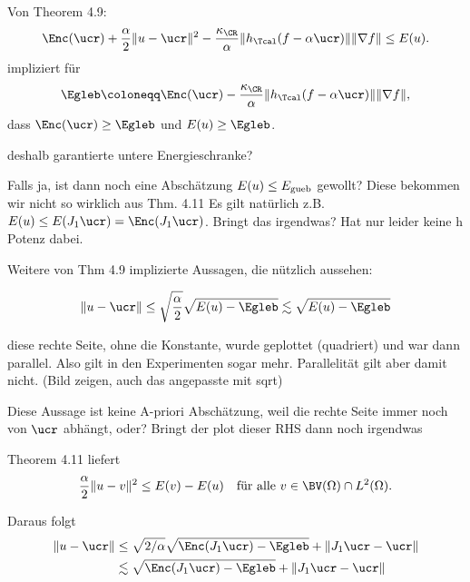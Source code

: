 Von Theorem 4.9:
  \begin{align*}
    \Enc(\ucr)+\frac{\alpha}{2}\Vert u-\ucr\Vert^2
    -\frac{\kappa_\CR}{\alpha}\Vert
    h_\Tcal(f-\alpha\ucr)\Vert \Vert\nabla f\Vert\leq E(u).
  \end{align*}
  impliziert für
  \begin{align*}
    \Egleb 
    \coloneqq 
    \Enc(\ucr) - \frac{\kappa_\CR}{\alpha}\Vert h_\Tcal(f-\alpha\ucr)\Vert
    \Vert \nabla f\Vert,
  \end{align*}
    dass $\Enc(\ucr)\geq \Egleb$ und $E(u)\geq \Egleb$. 

      deshalb garantierte untere Energieschranke?

      Falls ja, ist dann noch eine Abschätzung $E(u)\leq E_\textup{gueb}$ gewollt?
      Diese bekommen wir nicht so wirklich aus Thm. 4.11
      Es gilt natürlich z.B.
      $E(u)\leq E(J_1\ucr)=\Enc(J_1\ucr)$. Bringt das irgendwas? Hat nur
      leider keine h Potenz dabei.

      Weitere von Thm 4.9 implizierte Aussagen, die nützlich aussehen:

      \begin{align*}
        \Vert u-\ucr\Vert\leq 
        \sqrt{\frac{\alpha}{2}}\sqrt{E(u)-\Egleb}
        \lesssim
        \sqrt{E(u)-\Egleb}
      \end{align*}

      diese rechte Seite, ohne die Konstante, wurde geplottet (quadriert)
      und war dann parallel. Also gilt in den Experimenten sogar mehr. 
      Parallelität gilt aber damit nicht. (Bild zeigen, auch das angepasste
      mit sqrt)

      Diese Aussage ist keine A-priori Abschätzung, weil die rechte
      Seite immer noch von $\ucr$ abhängt, oder?
      Bringt der plot dieser RHS dann noch irgendwas
      

      Theorem 4.11 liefert
  \begin{align*}
    \frac{\alpha}{2}\Vert u-v\Vert^2 \leq E(v)-E(u)\quad
    \text{für alle } v\in\BV(\Omega)\cap L^2(\Omega).
  \end{align*}

  Daraus folgt
  \begin{align*}
    \Vert u-\ucr\Vert &\leq
    \sqrt{2/\alpha}\sqrt{\Enc(J_1{\ucr})-\Egleb} + \Vert J_1\ucr-\ucr\Vert\\
    &\lesssim
    \sqrt{\Enc(J_1{\ucr})-\Egleb} + \Vert J_1\ucr-\ucr\Vert
  \end{align*}

